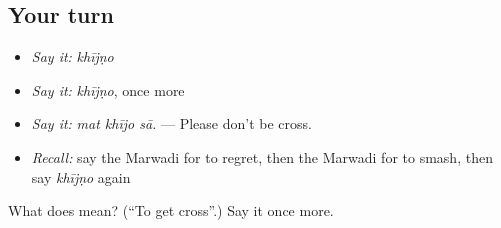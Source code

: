 \subsection*{Your turn}
\begin{itemize}
\raggedright
  \item \emph{Say it:} \emph{khījṇo}
  \item \emph{Say it:} \emph{khījṇo}, once more
  \item \emph{Say it:} \emph{mat khījo sā.} — Please don't be cross.
  \item \emph{Recall:} say the Marwadi for to regret, then the Marwadi for to smash, then say \emph{khījṇo} again
\end{itemize}

\begin{tcolorbox}[breakable,colback=teal!4,colframe=teal!35!black,title={Before you move on}]
What does  mean? (\textquotedblleft{}To get cross\textquotedblright{}.) Say it once more.
\end{tcolorbox}
